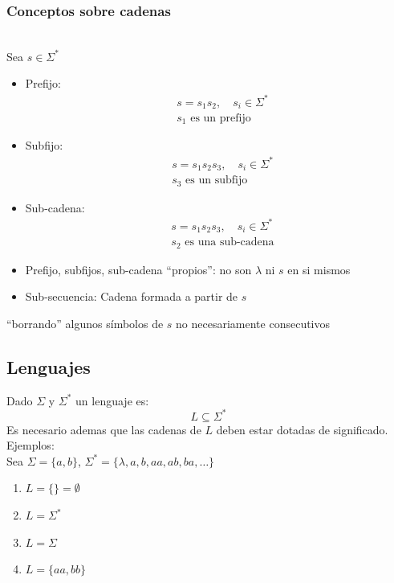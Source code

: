 \subsubsection{Conceptos sobre cadenas}\\
Sea $s \in \Sigma^*$
\begin{itemize}
\item Prefijo: 
    \begin{align*}
        & s = s_1 s_2,\quad s_i \in \Sigma^*\\
        & s_1 \text{ es un prefijo}
    \end{align*}
    
\item Subfijo: 
    \begin{align*}
        & s = s_1 s_2 s_3,\quad s_i \in \Sigma^*\\
        & s_3 \text{ es un subfijo}
    \end{align*}
\item Sub-cadena: 
    \begin{align*}
        & s = s_1 s_2 s_3,\quad s_i \in \Sigma^*\\
        & s_2 \text{ es una sub-cadena}
    \end{align*}
\item Prefijo, subfijos, sub-cadena ``propios'': no son $\lambda$ ni $s$ en si mismos
\item Sub-secuencia: Cadena formada a partir de $s$ 
\end{itemize} ``borrando'' algunos símbolos de $s$ no necesariamente consecutivos

\subsection{Lenguajes}
Dado $\Sigma$ y $\Sigma^*$ un lenguaje es:
\begin{equation*}
    L \subseteq \Sigma^*
\end{equation*}
Es necesario ademas que las cadenas de $L$ deben estar dotadas de significado.\\
Ejemplos:\\
Sea $\Sigma = \{a, b\}$, $\Sigma^*=\{\lambda, a, b, aa, ab, ba, \dots\}$
\begin{enumerate}
    \item $L=\{\}=\emptyset$
    \item $L = \Sigma^*$
    \item $L = \Sigma$
    \item $L = \{aa, bb\}$
\end{enumerate}
